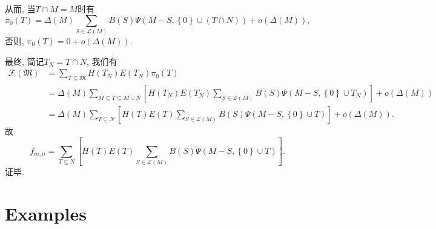 \documentclass[12pt,a4paper,UTF8]{article}
\numberwithin{equation}{section}
\newcommand{\mbrace}[1]{\left[#1\right]}
\newcommand{\bbrace}[1]{\left\{#1\right\}}
\newcommand{\FM}{\mathfrak{M}}
\newcommand{\CF}{\mathcal{F}}
\begin{document}
从而, 当$T\cap M=M$时有
\begin{equation}
  \pi_0(T)=\Delta(M)\sum_{S\in \mathcal L(M)}{B(S)\Psi(M-S,\bbrace{0}\cup (T\cap N))}+o(\Delta(M)),
\end{equation}
否则, $\pi_0(T)=0+o(\Delta(M))$.

最终, 简记$T_N=T\cap N$, 我们有
\begin{equation}
\begin{aligned}
\CF(\FM)&=\sum_{T\subseteq \FM}{H(T_N)E(T_N)\pi_0(T)} \\ 
&=\Delta(M)\sum_{M\subseteq T\subseteq M\cup N}\mbrace{H(T_N)E(T_N)\sum_{S\in \mathcal L(M)}{B(S)\Psi(M-S,\bbrace{0}\cup T_N)}}+o(\Delta(M)) \\
&=\Delta(M)\sum_{T\subseteq N}\mbrace{H(T)E(T)\sum_{S\in \mathcal L(M)}{B(S)\Psi(M-S,\bbrace{0}\cup T)}}+o(\Delta(M)) .
\end{aligned}
\end{equation}
故
\begin{equation}
f_{m,n}=\sum_{T\subseteq N}\mbrace{H(T)E(T)\sum_{S\in \mathcal L(M)}{B(S)\Psi(M-S,\bbrace{0}\cup T)}}. 
\end{equation}
证毕. 

\section{Examples}\label{example}
\end{document}
